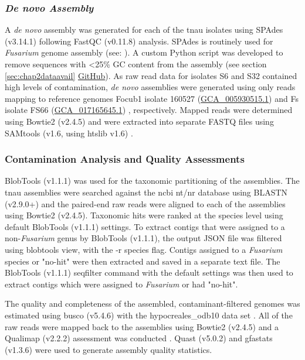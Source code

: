 \subsubsection{\textit{De novo Assembly}}
A \textit{de novo} assembly was generated for each of the \ac{tnau} isolates using SPAdes (v3.14.1) \parencite{Prjibelski2020} following FastQC (v0.11.8) analysis. SPAdes is routinely used for \textit{Fusarium} genome assembly
(see: \textcite{Armitage2018, Hudson2020, Tanaka2022}). A custom Python script was developed to remove sequences with <25\% GC content from the assembly (see section \ref{sec:chap2dataavail}  \href{https://github.com/JamiePike/NewTools-Project/blob/master/bin/gcTrimmer.py}{GitHub}). As raw read data for isolates S6 and S32 contained high levels of contamination, \textit{de novo} assemblies were generated using only reads mapping to reference genomes \ac{Focub1} isolate 160527 (\href{https://www.ncbi.nlm.nih.gov/datasets/genome/GCA_005930515.1/}{GCA\_005930515.1}) \parencite{Asai2019} and \acl{Fs} isolate FS66 (\href{https://www.ncbi.nlm.nih.gov/datasets/genome/GCA_017165645.1/}{GCA\_017165645.1}) \parencite{Cui2021}, respectively. Mapped reads were determined using Bowtie2 (v2.4.5) and were extracted into separate FASTQ files using SAMtools (v1.6, using htslib v1.6) \parencite{Danecek2021}. 

\subsubsection{Contamination Analysis and Quality Assessments}
BlobTools (v1.1.1) \parencite{Laetsch2017} was used for the taxonomic partitioning of the assemblies. The \ac{tnau} assemblies were searched against the \ac{ncbi} nt/nr database using BLASTN (v2.9.0+) and the paired-end raw reads were aligned to each of the assemblies using Bowtie2 (v2.4.5). Taxonomic hits were ranked at the species level using default BlobTools (v1.1.1) settings. To extract contigs that were assigned to a non-\textit{Fusarium} genus by BlobTools (v1.1.1), the output JSON file was filtered using blobtools view, with the -r species flag. Contigs assigned to a \textit{Fusarium} species or "no-hit" were then extracted and saved in a separate text file. The BlobTools (v1.1.1) seqfilter command with the default settings was then used to extract contigs which were assigned to \textit{Fusarium} or had "no-hit".

The quality and completeness of the assembled, contaminant-filtered genomes was estimated using \ac{busco} (v5.4.6) with the hypocreales\_odb10 data set \parencite{Manni2021}. All of the raw reads were mapped back to the assemblies using Bowtie2 (v2.4.5) and a Qualimap (v2.2.2) assessment was conducted \parencite{Garcia-Alcalde2012}. Quast (v5.0.2) \parencite{Gurevich2013}  and gfastats (v1.3.6) \parencite{Formenti2022} were used to generate assembly quality statistics. 

